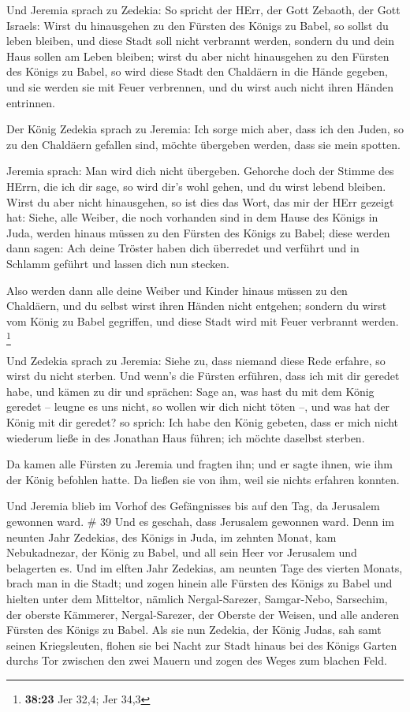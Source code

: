  Und Jeremia sprach zu Zedekia: So spricht der HErr, der
Gott Zebaoth, der Gott Israels: Wirst du hinausgehen zu den Fürsten des
Königs zu Babel, so sollst du leben bleiben, und diese Stadt soll nicht
verbrannt werden, sondern du und dein Haus sollen am Leben bleiben;
 wirst du aber nicht hinausgehen zu den Fürsten des Königs
zu Babel, so wird diese Stadt den Chaldäern in die Hände gegeben, und
sie werden sie mit Feuer verbrennen, und du wirst auch nicht ihren
Händen entrinnen.

 Der König Zedekia sprach zu Jeremia: Ich sorge mich aber,
dass ich den Juden, so zu den Chaldäern gefallen sind, möchte übergeben
werden, dass sie mein spotten.

 Jeremia sprach: Man wird dich nicht übergeben. Gehorche
doch der Stimme des HErrn, die ich dir sage, so wird dir's wohl gehen,
und du wirst lebend bleiben.  Wirst du aber nicht
hinausgehen, so ist dies das Wort, das mir der HErr gezeigt hat:
 Siehe, alle Weiber, die noch vorhanden sind in dem Hause
des Königs in Juda, werden hinaus müssen zu den Fürsten des Königs zu
Babel; diese werden dann sagen: Ach deine Tröster haben dich überredet
und verführt und in Schlamm geführt und lassen dich nun stecken.

 Also werden dann alle deine Weiber und Kinder hinaus
müssen zu den Chaldäern, und du selbst wirst ihren Händen nicht
entgehen; sondern du wirst vom König zu Babel gegriffen, und diese Stadt
wird mit Feuer verbrannt werden. \footnote{\textbf{38:23} Jer 32,4; Jer
  34,3}

 Und Zedekia sprach zu Jeremia: Siehe zu, dass niemand
diese Rede erfahre, so wirst du nicht sterben.  Und wenn's
die Fürsten erführen, dass ich mit dir geredet habe, und kämen zu dir
und sprächen: Sage an, was hast du mit dem König geredet -- leugne es
uns nicht, so wollen wir dich nicht töten --, und was hat der König mit
dir geredet?  so sprich: Ich habe den König gebeten, dass
er mich nicht wiederum ließe in des Jonathan Haus führen; ich möchte
daselbst sterben.

 Da kamen alle Fürsten zu Jeremia und fragten ihn; und er
sagte ihnen, wie ihm der König befohlen hatte. Da ließen sie von ihm,
weil sie nichts erfahren konnten.

 Und Jeremia blieb im Vorhof des Gefängnisses bis auf den
Tag, da Jerusalem gewonnen ward. \# 39  Und es geschah, dass
Jerusalem gewonnen ward. Denn im neunten Jahr Zedekias, des Königs in
Juda, im zehnten Monat, kam Nebukadnezar, der König zu Babel, und all
sein Heer vor Jerusalem und belagerten es.  Und im elften
Jahr Zedekias, am neunten Tage des vierten Monats, brach man in die
Stadt;  und zogen hinein alle Fürsten des Königs zu Babel
und hielten unter dem Mitteltor, nämlich Nergal-Sarezer, Samgar-Nebo,
Sarsechim, der oberste Kämmerer, Nergal-Sarezer, der Oberste der Weisen,
und alle anderen Fürsten des Königs zu Babel.  Als sie nun
Zedekia, der König Judas, sah samt seinen Kriegsleuten, flohen sie bei
Nacht zur Stadt hinaus bei des Königs Garten durchs Tor zwischen den
zwei Mauern und zogen des Weges zum blachen Feld.


